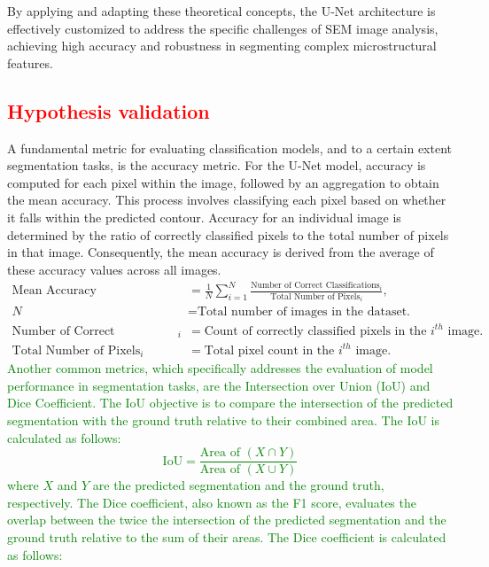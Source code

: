 \documentclass[preprint,12pt]{elsarticle}
\begin{document}
\begin{itemize}
By applying and adapting these theoretical concepts, the U-Net architecture is effectively customized to address the specific challenges of SEM image analysis, achieving high accuracy and robustness in segmenting complex microstructural features.









\subsection{\textcolor{red}{Hypothesis validation}}
A fundamental metric for evaluating classification models, and to a certain extent segmentation tasks, is the accuracy metric. For the U-Net model, accuracy is computed for each pixel within the image, followed by an aggregation to obtain the mean accuracy. This process involves classifying each pixel based on whether it falls within the predicted contour. Accuracy for an individual image is determined by the ratio of correctly classified pixels to the total number of pixels in that image. Consequently, the mean accuracy is derived from the average of these accuracy values across all images.
\begin{align*}
\text{Mean Accuracy} & = \frac{1}{N} \sum_{i=1}^{N} \frac{\text{Number of Correct Classifications}_i}{\text{Total Number of Pixels}_i}, \\
N & = \text{Total number of images in the dataset.} \\
\text{Number of Correct Classifications}_i & = \text{Count of correctly classified pixels in the $i^{th}$ image.} \\
\text{Total Number of Pixels}_i & = \text{Total pixel count in the $i^{th}$ image.}
\end{align*}
\textcolor{green}{Another common metrics, which specifically addresses the evaluation of model performance in segmentation tasks, are the Intersection over Union (IoU) and Dice Coefficient.
The IoU objective is to compare the intersection of the predicted segmentation with the ground truth relative to their combined area. The IoU is calculated as follows:
\begin{equation}
\text{IoU} = \frac{\text{Area of } (X \cap Y)}{\text{Area of } (X \cup Y)}
\end{equation}
where $X$ and $Y$ are the predicted segmentation and the ground truth, respectively.
The Dice coefficient, also known as the F1 score, evaluates the overlap between the twice the intersection of the predicted segmentation and the ground truth relative to the sum of their areas. The Dice coefficient is calculated as follows:
}
\end{itemize}
\end{document}
